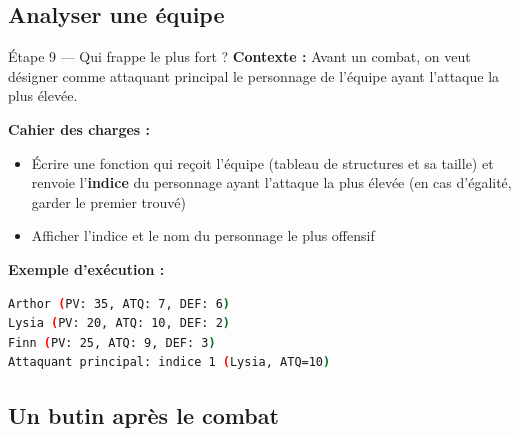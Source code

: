 \subsection{Analyser une équipe}

\begin{UPSTIManipulation}{Étape 9 — Qui frappe le plus fort ?}
  \textbf{Contexte :} Avant un combat, on veut désigner comme attaquant principal le personnage
  de l'équipe ayant l'attaque la plus élevée.

  \textbf{Cahier des charges :}
  \begin{itemize}
    \item Écrire une fonction qui reçoit l'équipe (tableau de structures et sa taille) et
      renvoie l'\textbf{indice} du personnage ayant l'attaque la plus élevée (en cas d'égalité,
      garder le premier trouvé)
    \item Afficher l'indice et le nom du personnage le plus offensif
  \end{itemize}

  \textbf{Exemple d'exécution :}
  \begin{lstlisting}[language=bash]
Arthor (PV: 35, ATQ: 7, DEF: 6)
Lysia (PV: 20, ATQ: 10, DEF: 2)
Finn (PV: 25, ATQ: 9, DEF: 3)
Attaquant principal: indice 1 (Lysia, ATQ=10)
  \end{lstlisting}

\end{UPSTIManipulation}

\subsection{Un butin après le combat}

